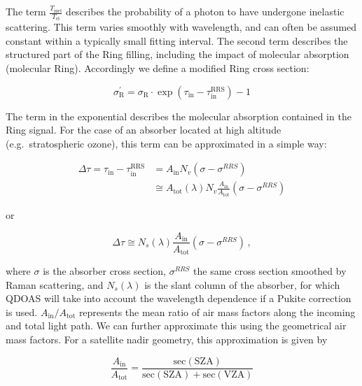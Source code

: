The term $\frac{T_\mathrm{inel}}{T_\mathrm{el}}$  describes the probability of a photon to have undergone inelastic scattering. This term varies smoothly with wavelength, and can often be assumed constant within a typically small fitting interval. The second term describes the structured part of the Ring filling, including the impact of molecular absorption (molecular Ring). Accordingly we define a modified Ring cross section:

\begin{equation}
  \label{eq:sigma_ring_modified}
\sigma_\mathrm{R}^\prime=\sigma_\mathrm{R}\cdot\exp\left( \tau_\mathrm{in}-\tau_\mathrm{in}^\mathrm{RRS} \right) -1
\end{equation}

The term in the exponential describes the molecular absorption contained in the Ring signal. For the case of an absorber located at high altitude (e.g.\ stratospheric ozone), this term can be approximated in a simple way:

\begin{align}
  \Delta\tau =\tau_\mathrm{in}-\tau_\mathrm{in}^\mathrm{RRS} &=A_\mathrm{in}N_v\left( \sigma-\sigma^{RRS} \right) \\
&\cong A_\mathrm{tot}( \lambda ) N_v \frac{A_\mathrm{in}}{A_\mathrm{tot}} \left( \sigma-\sigma^{RRS} \right)
\end{align}

or

\begin{equation}
\Delta\tau\cong N_s(\lambda) \frac{A_\mathrm{in}}{A_\mathrm{tot}} \left( \sigma-\sigma^{RRS} \right) \, ,
\end{equation}

where $\sigma$ is the absorber cross section, $\sigma^{RRS}$ the same cross section smoothed by Raman scattering, and $N_s(\lambda)$ is the slant column of the absorber, for which QDOAS will take into account the wavelength dependence if a Pukite correction is used.  $A_\mathrm{in}/A_\mathrm{tot}$  represents the mean ratio of air mass factors along the incoming and total light path.  We can further approximate this using the geometrical air mass factors.  For a satellite nadir geometry, this approximation is given by

\begin{equation}
\frac{A_\mathrm{in}}{A_\mathrm{tot}} = \frac{\mathrm{sec}\left( \mathrm{SZA}\right) }{\mathrm{sec}\left( \mathrm{SZA}\right) + \mathrm{sec}\left( \mathrm{VZA}\right) }
\end{equation}

